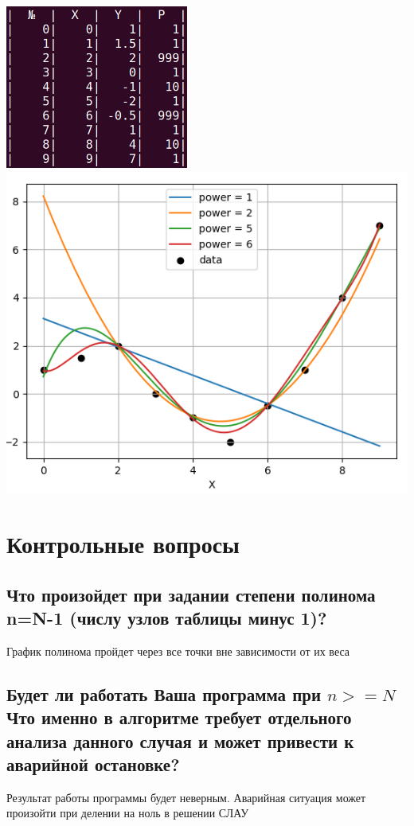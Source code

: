 \documentclass[a4paper,12pt]{article}
\begin{document}
\begin{center}
    \includegraphics[width=6cm]{table3.png}
    \includegraphics[scale=0.6]{graph3.png}   
\end{center}

\section{Контрольные вопросы}
\subsection{Что произойдет при задании  степени полинома n=N-1 (числу узлов таблицы минус 1)?}
График полинома пройдет через все точки вне зависимости от их веса

\subsection{Будет  ли  работать  Ваша  программа  при $n >= N$  Что  именно  в  алгоритме  требует отдельного анализа данного случая и может привести к аварийной остановке?}
Результат работы программы будет неверным. Аварийная ситуация может произойти при делении на ноль в решении СЛАУ
\end{document}

